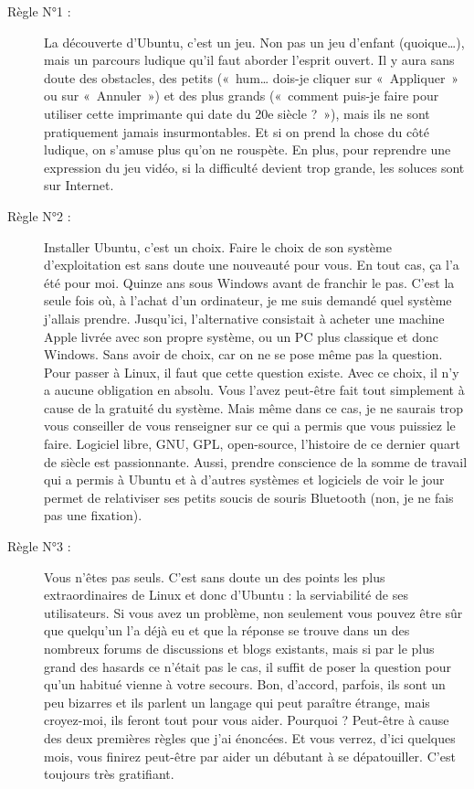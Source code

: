 \begin{description}
\item[Règle N°1 :] La découverte d'Ubuntu, c'est un jeu. Non pas un jeu d'enfant (quoique\ldots{}), mais un parcours ludique qu'il faut aborder l'esprit ouvert. Il y aura sans doute des obstacles, des petits («~hum\ldots{} dois-je cliquer sur «~Appliquer~» ou sur «~Annuler~») et des plus grands («~comment puis-je faire pour utiliser cette imprimante qui date du 20e siècle ?~»), mais ils ne sont pratiquement jamais insurmontables. Et si on prend la chose du côté ludique, on s'amuse plus qu'on ne rouspète. En plus, pour reprendre une expression du jeu vidéo, si la difficulté devient trop grande, les soluces sont sur Internet.
\item[Règle N°2 :] Installer Ubuntu, c'est un choix. Faire le choix de son système d'exploitation est sans doute une nouveauté pour vous. En tout cas, ça l'a été pour moi. Quinze ans sous Windows avant de franchir le pas. C'est la seule fois où, à l'achat d'un ordinateur, je me suis demandé quel système j'allais prendre. Jusqu'ici, l'alternative consistait à acheter une machine Apple livrée avec son propre système, ou un PC plus classique et donc Windows. Sans avoir de choix, car on ne se pose même pas la question. Pour passer à Linux, il faut que cette question existe. Avec ce choix, il n'y a aucune obligation en absolu. Vous l'avez peut-être fait tout simplement à cause de la gratuité du système. Mais même dans ce cas, je ne saurais trop vous conseiller de vous renseigner sur ce qui a permis que vous puissiez le faire. Logiciel libre, GNU, GPL, open-source, l'histoire de ce dernier quart de siècle est passionnante. Aussi, prendre conscience de la somme de travail qui a permis à Ubuntu et à d'autres systèmes et logiciels de voir le jour permet de relativiser ses petits soucis de souris Bluetooth (non, je ne fais pas une fixation).
\item[Règle N°3 :] Vous n'êtes pas seuls. C'est sans doute un des points les plus extraordinaires de Linux et donc d'Ubuntu : la serviabilité de ses utilisateurs. Si vous avez un problème, non seulement vous pouvez être sûr que quelqu'un l'a déjà eu et que la réponse se trouve dans un des nombreux forums de discussions et blogs existants, mais si par le plus grand des hasards ce n'était pas le cas, il suffit de poser la question pour qu'un habitué vienne à votre secours. Bon, d'accord, parfois, ils sont un peu bizarres et ils parlent un langage qui peut paraître étrange, mais croyez-moi, ils feront tout pour vous aider. Pourquoi ? Peut-être à cause des deux premières règles que j'ai énoncées. Et vous verrez, d'ici quelques mois, vous finirez peut-être par aider un débutant à se dépatouiller. C'est toujours très gratifiant.

\end{description}
